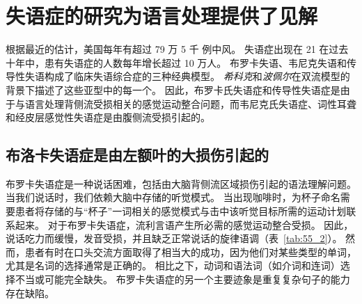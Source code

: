 \section{失语症的研究为语言处理提供了见解}

根据最近的估计，美国每年有超过 79 万 5 千 例中风。
失语症出现在 21%
在过去十年中，患有失语症的人数每年增长超过 10 万人。
布罗卡失语、韦尼克失语和传导性失语构成了临床失语综合症的三种经典模型。
\textit{希科克}和\textit{波佩尔}在双流模型的背景下描述了这些亚型中的每一个。
因此，布罗卡氏失语症和传导性失语症是由于与语言处理背侧流受损相关的感觉运动整合问题，而韦尼克氏失语症、词性耳聋和经皮层感觉性失语症是由腹侧流受损引起的。



\subsection{布洛卡失语症是由左额叶的大损伤引起的}

布罗卡失语症是一种说话困难，包括由大脑背侧流区域损伤引起的语法理解问题。
当我们说话时，我们依赖大脑中存储的听觉模式。
当出现咖啡时，为杯子命名需要患者将存储的与“杯子”一词相关的感觉模式与击中该听觉目标所需的运动计划联系起来。
对于布罗卡失语症，流利言语产生所必需的感觉运动整合受损。
因此，说话吃力而缓慢，发音受损，并且缺乏正常说话的旋律语调（表~\ref{tab:55_2}）。
然而，患者有时在口头交流方面取得了相当大的成功，因为他们对某些类型的单词，尤其是名词的选择通常是正确的。
相比之下，动词和语法词（如介词和连词）选择不当或可能完全缺失。
布罗卡失语症的另一个主要迹象是重复复杂句子的能力存在缺陷。


